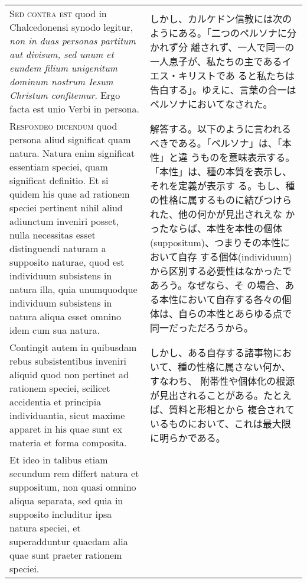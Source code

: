 \documentclass[10pt]{jsarticle} %
\begin{document}
\begin{longtable}{p{21em}p{21em}}
\\



{\scshape Sed contra est} quod in Chalcedonensi synodo legitur,
{\itshape non in duas personas partitum aut divisum, sed unum et
eundem filium unigenitum dominum nostrum Iesum Christum
confitemur}. Ergo facta est unio Verbi in persona.


&

しかし、カルケドン信教には次のようにある。「二つのペルソナに分かれず分
離されず、一人で同一の一人息子が、私たちの主であるイエス・キリストであ
ると私たちは告白する」。ゆえに、言葉の合一はペルソナにおいてなされた。


\\



{\scshape Respondeo dicendum} quod persona aliud significat quam
natura. Natura enim significat essentiam speciei, quam significat
definitio. Et si quidem his quae ad rationem speciei pertinent nihil
aliud adiunctum inveniri posset, nulla necessitas esset distinguendi
naturam a supposito naturae, quod est individuum subsistens in natura
illa, quia unumquodque individuum subsistens in natura aliqua esset
omnino idem cum sua natura.


&

解答する。以下のように言われるべきである。「ペルソナ」は、「本性」と違
うものを意味表示する。「本性」は、種の本質を表示し、それを定義が表示す
る。もし、種の性格に属するものに結びつけられた、他の何かが見出されえな
かったならば、本性を本性の個体(suppositum)、つまりその本性において自存
する個体(individuum)から区別する必要性はなかったであろう。なぜなら、そ
の場合、ある本性において自存する各々の個体は、自らの本性とあらゆる点で
同一だっただろうから。

\\

Contingit autem in quibusdam rebus subsistentibus inveniri aliquid
quod non pertinet ad rationem speciei, scilicet accidentia et
principia individuantia, sicut maxime apparet in his quae sunt ex
materia et forma composita.

&

しかし、ある自存する諸事物において、種の性格に属さない何か、すなわち、
附帯性や個体化の根源が見出されることがある。たとえば、質料と形相とから
複合されているものにおいて、これは最大限に明らかである。

\\

Et ideo in talibus etiam secundum rem differt natura et suppositum,
non quasi omnino aliqua separata, sed quia in supposito includitur
ipsa natura speciei, et superadduntur quaedam alia quae sunt praeter
rationem speciei.



\end{longtable}
\end{document}
